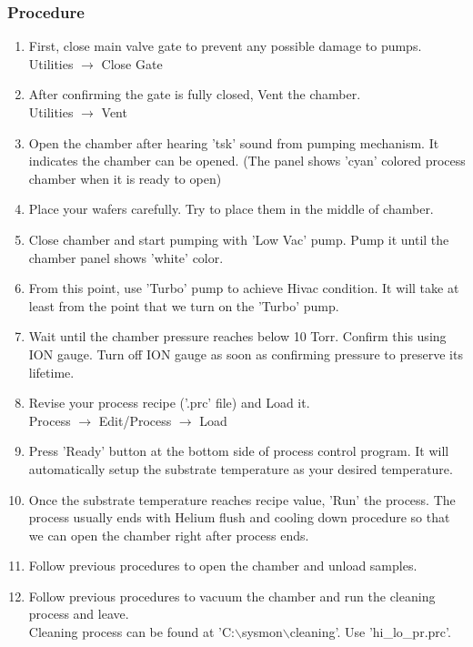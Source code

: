 \subsubsection{Procedure}
\begin{enumerate}
\item First, close main valve gate to prevent any possible damage to pumps. \\
Utilities $\rightarrow$ Close Gate
\item After confirming the gate is fully closed, Vent the chamber. \\
Utilities $\rightarrow$ Vent
\item Open the chamber after hearing 'tsk' sound from pumping mechanism. It indicates the chamber can be opened. (The panel shows 'cyan' colored process chamber when it is ready to open)
\item Place your wafers carefully. Try to place them in the middle of chamber.
\item Close chamber and start pumping with 'Low Vac' pump. Pump it until the chamber panel shows 'white' color. 
\item From this point, use 'Turbo' pump to achieve Hivac condition. It will take at least from the point that we turn on the 'Turbo' pump.
\item Wait until the chamber pressure reaches below 10 Torr. Confirm this using ION gauge. Turn off ION gauge as soon as confirming pressure to preserve its lifetime.
\item Revise your process recipe ('.prc' file) and Load it. \\
Process $\rightarrow$ Edit/Process $\rightarrow$ Load
\item Press 'Ready' button at the bottom side of process control program. It will automatically setup the substrate temperature as your desired temperature.
\item Once the substrate temperature reaches recipe value, 'Run' the process. The process usually ends with Helium flush and cooling down procedure so that we can open the chamber right after process ends.
\item Follow previous procedures to open the chamber and unload samples.
\item Follow previous procedures to vacuum the chamber and run the cleaning process and leave. \\
Cleaning process can be found at 'C:$\backslash$sysmon$\backslash$cleaning'. Use 'hi\_lo\_pr.prc'.
\end{enumerate}

